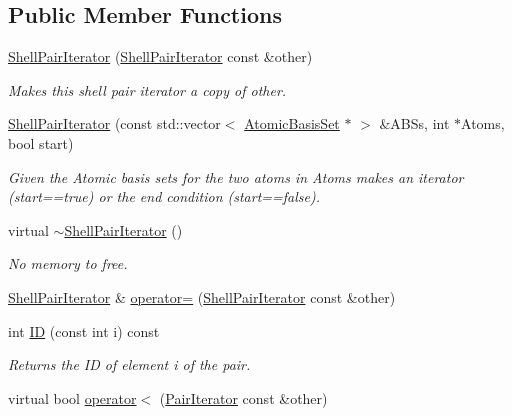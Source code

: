\subsection*{Public Member Functions}
\begin{DoxyCompactItemize}
\item 
\hyperlink{classJKBuilder_1_1ShellPairIterator_a09d264284681ba51a345d1bf04e73a1a}{ShellPairIterator} (\hyperlink{classJKBuilder_1_1ShellPairIterator}{ShellPairIterator} const \&other)
\begin{DoxyCompactList}\small\item\em Makes this shell pair iterator a copy of other. \item\end{DoxyCompactList}\item 
\hyperlink{classJKBuilder_1_1ShellPairIterator_aa348d2d0bd41d0944cf43db3ca6b967f}{ShellPairIterator} (const std::vector$<$ \hyperlink{classJKBuilder_1_1AtomicBasisSet}{AtomicBasisSet} $\ast$ $>$ \&ABSs, int $\ast$Atoms, bool start)
\begin{DoxyCompactList}\small\item\em Given the Atomic basis sets for the two atoms in Atoms makes an iterator (start==true) or the end condition (start==false). \item\end{DoxyCompactList}\item 
virtual \hyperlink{classJKBuilder_1_1ShellPairIterator_a4374ea1e5f0ed1fad10a7c4cf86f6d90}{$\sim$ShellPairIterator} ()
\begin{DoxyCompactList}\small\item\em No memory to free. \item\end{DoxyCompactList}\item 
\hyperlink{classJKBuilder_1_1ShellPairIterator}{ShellPairIterator} \& \hyperlink{classJKBuilder_1_1ShellPairIterator_af3001050bade3a939d83971d1a3f47e7}{operator=} (\hyperlink{classJKBuilder_1_1ShellPairIterator}{ShellPairIterator} const \&other)
\item 
int \hyperlink{classJKBuilder_1_1PairIterator_a370ad37c854fbbf6421ebf9ab35cd027}{ID} (const int i) const 
\begin{DoxyCompactList}\small\item\em Returns the ID of element i of the pair. \item\end{DoxyCompactList}\item 
virtual bool \hyperlink{classJKBuilder_1_1PairIterator_a1984297ca1081efc0513ec2f5e6a6177}{operator$<$} (\hyperlink{classJKBuilder_1_1PairIterator}{PairIterator} const \&other)

\end{DoxyCompactItemize}
